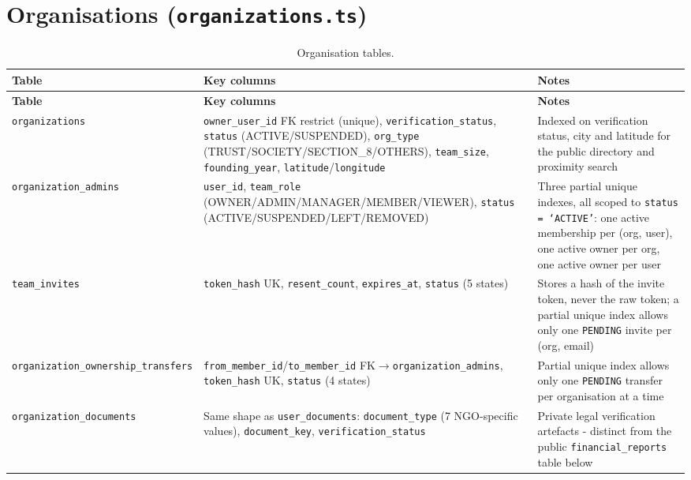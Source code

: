\section{Organisations (\texttt{organizations.ts})}
\begin{longtable}{|>{\raggedright\arraybackslash}p{}|>{\raggedright\arraybackslash}p{}|>{\raggedright\arraybackslash}p{}|}
\caption{Organisation tables.}\\\hline
\textbf{Table} & \textbf{Key columns} & \textbf{Notes}\\\hline
\endfirsthead\hline\textbf{Table} & \textbf{Key columns} & \textbf{Notes}\\\hline\endhead
\texttt{organizations} & \texttt{owner\_user\_id} FK restrict (unique), \texttt{verification\_status}, \texttt{status} (ACTIVE/\allowbreak SUSPENDED), \texttt{org\_type} (TRUST/\allowbreak SOCIETY/\allowbreak SECTION\_8/\allowbreak OTHERS), \texttt{team\_size}, \texttt{founding\_year}, \texttt{latitude}/\allowbreak\texttt{longitude} & Indexed on verification status, city and latitude for the public directory and proximity search\\\hline
\texttt{organization\_\allowbreak admins} & \texttt{user\_id}, \texttt{team\_role} (OWNER/\allowbreak ADMIN/\allowbreak MANAGER/\allowbreak MEMBER/\allowbreak VIEWER), \texttt{status} (ACTIVE/\allowbreak SUSPENDED/\allowbreak LEFT/\allowbreak REMOVED) & Three partial unique indexes, all scoped to \texttt{status = `ACTIVE'}: one active membership per (org, user), one active owner per org, one active owner per user\\\hline
\texttt{team\_invites} & \texttt{token\_hash} UK, \texttt{resent\_count}, \texttt{expires\_at}, \texttt{status} (5 states) & Stores a hash of the invite token, never the raw token; a partial unique index allows only one \texttt{PENDING} invite per (org, email)\\\hline
\texttt{organization\_\allowbreak ownership\_\allowbreak transfers} & \texttt{from\_member\_id}/\texttt{to\_member\_id} FK$\to$\texttt{organization\_admins}, \texttt{token\_hash} UK, \texttt{status} (4 states) & Partial unique index allows only one \texttt{PENDING} transfer per organisation at a time\\\hline
\texttt{organization\_\allowbreak documents} & Same shape as \texttt{user\_documents}: \texttt{document\_type} (7 NGO-specific values), \texttt{document\_key}, \texttt{verification\_status} & Private legal verification artefacts - distinct from the public \texttt{financial\_reports} table below\\\hline
\end{longtable}

